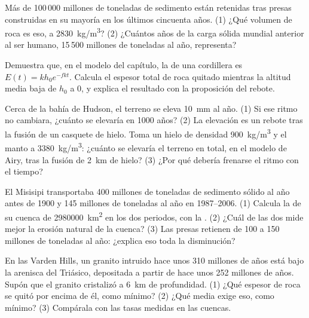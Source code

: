 \begin{exercise}[$\star\star$]\label{exo:g12:destruction-of-mountains:11}
Más de 100\,000 millones de toneladas de sedimento están retenidas tras
presas construidas en su mayoría en los últimos cincuenta años. (1) ¿Qué
volumen de roca es eso, a \qty{2830}{kg/m^3}? (2) ¿Cuántos años de la carga
sólida mundial anterior al ser humano, 15\,500 millones de toneladas al año,
representa?
\end{exercise}

\begin{exercise}[$\star\star\star$]\label{exo:g12:destruction-of-mountains:12}
Demuestra que, en el modelo del capítulo, la  de una
cordillera es $E(t) = k h_0 e^{-fkt}$. Calcula el espesor total de roca
quitado mientras la altitud media baja de $h_0$ a 0, y explica el resultado
con la proposición del rebote.
\end{exercise}

\begin{exercise}[$\star\star\star$]\label{exo:g12:destruction-of-mountains:13}
Cerca de la bahía de Hudson, el terreno se eleva \qty{10}{mm} al año. (1) Si
ese ritmo no cambiara, ¿cuánto se elevaría en 1000 años? (2) La elevación es
un rebote tras la fusión de un casquete de hielo. Toma un hielo de densidad
\qty{900}{kg/m^3} y el manto a \qty{3380}{kg/m^3}: ¿cuánto se elevaría el
terreno en total, en el modelo de Airy, tras la fusión de \qty{2}{km} de
hielo? (3) ¿Por qué debería frenarse el ritmo con el tiempo?
\end{exercise}

\begin{exercise}[$\star\star\star$]\label{exo:g12:destruction-of-mountains:14}
El Misisipi transportaba 400 millones de toneladas de sedimento sólido al año
antes de 1900 y 145 millones de toneladas al año en 1987--2006. (1) Calcula la
 de su cuenca de \qty{2980000}{km^2} en los dos periodos,
con la . (2) ¿Cuál de las dos mide mejor la erosión natural de
la cuenca? (3) Las presas retienen de 100 a 150 millones de toneladas al año:
¿explica eso toda la disminución?
\end{exercise}

\begin{exercise}[$\star\star\star$]\label{exo:g12:destruction-of-mountains:15}
En las Varden Hills, un granito intruido hace unos 310 millones de años está
bajo la arenisca del Triásico, depositada a partir de hace unos 252 millones
de años. Supón que el granito cristalizó a \qty{6}{km} de profundidad. (1) ¿Qué
espesor de roca se quitó por encima de él, como mínimo? (2) ¿Qué  media exige eso, como mínimo? (3) Compárala con las tasas medidas
en las cuencas.
\end{exercise}

